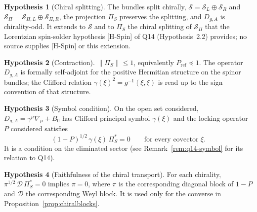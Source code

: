 \documentclass[11pt]{article}
\theoremstyle{definition}
\newtheorem{hypothesis}{Hypothesis}
\newcommand{\PiS}{\Pi_S}
\newcommand{\Deff}{\mathcal D}
\begin{document}
    \begin{hypothesis}[Chiral splitting]
      \label{hyp:chiral-splitting}
      The bundles split chirally, $\mathcal S=\mathcal S_L\oplus\mathcal S_R$ and
      $\mathcal S_\Pi=\mathcal S_{\Pi,L}\oplus\mathcal S_{\Pi,R}$, the projection $\PiS$ preserves the splitting,
      and $D_{g,A}$ is chirality-odd.
      It extends to $\mathcal S$ and to $\PiS$ the chiral splitting of $\mathcal S_\Pi$ that the Lorentzian spin-solder
      hypothesis [H-Spin] of Q14 (Hypothesis~2.2) provides; no source supplies [H-Spin] or this extension.
    \end{hypothesis}

    \begin{hypothesis}[Contraction]
      \label{hyp:contraction}
      $\|\PiS\|\le1$, equivalently $P_{\mathrm{ref}}\preceq 1$.
      The operator $D_{g,A}$ is formally self-adjoint for the positive Hermitian structure on the spinor bundles; the
      Clifford relation $\gamma(\xi)^2=g^{-1}(\xi,\xi)$ is read up to the sign convention of that structure.
    \end{hypothesis}

    \begin{hypothesis}[Symbol condition]
      \label{hyp:symbol}
      On the open set considered, $D_{g,A}=\gamma^{\mu}\nabla_{\mu}+B_0$ has Clifford principal symbol $\gamma(\xi)$ and
      the locking operator $P$ considered satisfies
      \begin{equation}
        \label{eq:hsym}
        (1-P)^{1/2}\,\gamma(\xi)\,\PiS^{*}=0\qquad\text{for every covector }\xi.
      \end{equation}
      It is a condition on the eliminated sector (see Remark~\ref{rem:q14-symbol} for its relation to Q14).
    \end{hypothesis}

    \begin{hypothesis}[Faithfulness of the chiral transport]
      \label{hyp:faithful}
      For each chirality, $\pi^{1/2}\,\Deff\,\PiS^{*}=0$ implies $\pi=0$, where $\pi$ is the corresponding diagonal
      block of $1-P$ and $\Deff$ the corresponding Weyl block.
      It is used only for the converse in Proposition~\ref{prop:chiralblocks}.
    \end{hypothesis}
\end{document}
